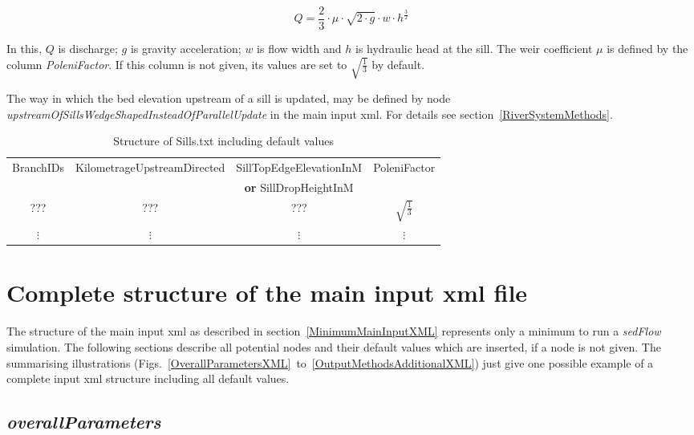 \documentclass[11pt,a4paper]{article}
\begin{document}
\begin{equation}
Q = \frac{2}{3} \cdot \mu \cdot \sqrt{2 \cdot g} \cdot w \cdot h^{\frac{3}{2}}
\end{equation}

In this, $Q$ is discharge; $g$ is gravity acceleration; $w$ is flow width and $h$ is hydraulic head at the sill. The weir coefficient $\mu$ is defined by the column \emph{PoleniFactor}. If this column is not given, its values are set to $\sqrt{\frac{1}{3}}$ by default.

The way in which the bed elevation upstream of a sill is updated, may be defined by node \emph{upstreamOfSillsWedgeShapedInsteadOfParallelUpdate} in the main input xml. For details see section~\ref{RiverSystemMethods}.

\begin{table}[h]
\caption{Structure of Sills.txt including default values}
\label{SillsFile}
\vskip4mm
\begin{adjustwidth}{-4cm}{-4cm}
\centering
\begin{tabular}{c|c|c|c}
\hline\hline
\multirow{2}{*}{BranchIDs} & \multirow{2}{*}{KilometrageUpstreamDirected} & SillTopEdgeElevationInM & \multirow{2}{*}{PoleniFactor}\\
 & & \textbf{or} SillDropHeightInM & \\
\hline
??? & ??? & ??? & $\sqrt{\frac{1}{3}}$\\
\hline
$\vdots$ & $\vdots$ & $\vdots$ & $\vdots$\\
\hline\hline
\end{tabular}
\end{adjustwidth}
\end{table}

\section{Complete structure of the main input xml file}\label{CompleteXML}
The structure of the main input xml as described in section~\ref{MinimumMainInputXML} represents only a minimum to run a \emph{sedFlow} simulation. The following sections describe all potential nodes and their default values which are inserted, if a node is not given. The summarising illustrations (Figs.~\ref{OverallParametersXML}~to~\ref{OutputMethodsAdditionalXML}) just give one possible example of a complete input xml structure including all default values.

\subsection{\emph{overallParameters}}\label{OverallParameters}
\end{document}
